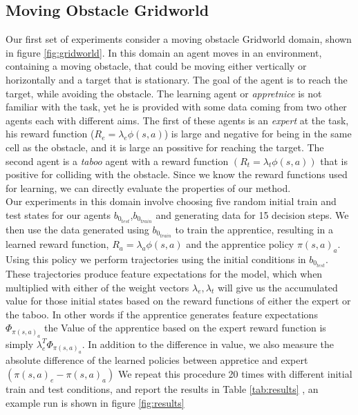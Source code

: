 \documentclass[letterpaper]{article}
\begin{document}
\subsection{Moving Obstacle Gridworld}
Our first set of experiments consider a moving obstacle Gridworld domain, shown in figure \ref{fig:gridworld}.
In this domain an agent moves in an environment, containing a moving obstacle, that could be moving either vertically
or horizontally and a target that is stationary. The goal of the agent is to reach the target, while avoiding 
the obstacle. The learning agent or \emph{appretnice} is not familiar with the task, yet he is provided with some data coming from two other agents
each with different aims. The first of these agents is an \emph{expert} at the task, his reward function ($R_e = \lambda_e\phi(s,a)$) is large and negative
for being in the same cell as the obstacle, and it is large an possitive for reaching the target. The second agent is a
\emph{taboo} agent with a reward function $(R_t=\lambda_t\phi(s,a))$ that is positive for colliding with the obstacle. Since we know the reward functions used for learning, we can directly evaluate the properties of our method. \\
Our experiments in this domain involve choosing five random initial train and test states for our agents $b_{0_{test}}$,$b_{0_{train}}$ and generating data for 15 decision steps. We then use the data generated using $b_{0_{train}}$ to train the apprentice, resulting in a learned reward function, $R_a = \lambda_a\phi(s,a)$ and the apprentice policy $\pi(s,a)_a$. Using this policy we perform trajectories using the initial conditions in $b_{0_{test}}$. These trajectories produce feature expectations for the model, which when multiplied with either of the weight vectors $\lambda_e,\lambda_t$ will give us the accumulated value for those initial states based on the reward functions of either the expert or the taboo. In other words if the apprentice generates feature expectations $\Phi_{\pi(s,a)_a}$ the Value of the apprentice based on the expert reward function is simply $\lambda_e^T\Phi_{\pi(s,a)_a}$. In addition to the difference in value, we also measure the absolute difference of the learned policies between appretice and expert $(\pi(s,a)_e - \pi(s,a)_a)$ We repeat this procedure 20 times with different initial train and test conditions, and report the results in Table \ref{tab:results} , an example run is shown in figure \ref{fig:results}
\end{document}
